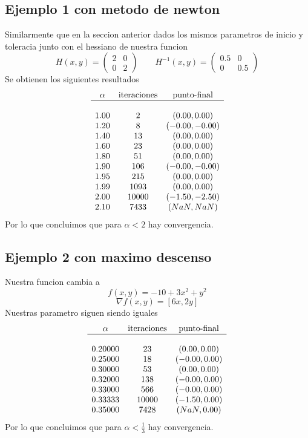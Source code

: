 \documentclass[letterpaper]{article}
\begin{document}
\subsection*{Ejemplo 1 con metodo de newton}
\noindent Similarmente que en la seccion anterior dados los mismos
parametros de inicio y toleracia junto con el hessiano de nuestra funcion
\[ H(x,y) =
  \begin{pmatrix}
    2 & 0 \\
    0 & 2
  \end{pmatrix}
  \qquad
  H^{-1}(x,y) =
  \begin{pmatrix}
    0.5 & 0 \\
    0 & 0.5
  \end{pmatrix}
\]
Se obtienen los siguientes resultados
\[
\begin{array}{c c c}
  \alpha & \text{iteraciones} & \text{punto-final} \\
  \hline \\
  1.00 & 2     & (0.00, 0.00)   \\
  1.20 & 8     & (-0.00, -0.00) \\
  1.40 & 13    & (0.00, 0.00)   \\
  1.60 & 23    & (0.00, 0.00)   \\
  1.80 & 51    & (0.00, 0.00)   \\
  1.90 & 106   & (-0.00, -0.00) \\
  1.95 & 215   & (0.00, 0.00)   \\
  1.99 & 1093  & (0.00, 0.00)   \\
  2.00 & 10000 & (-1.50, -2.50) \\
  2.10 & 7433  & (NaN, NaN)     \\
\end{array}
\]
Por lo que concluimos que para \(\alpha < 2\) hay convergencia.

\subsection*{Ejemplo 2 con maximo descenso}
\noindent Nuestra funcion cambia a
\[ f(x,y) = -10 + 3 x^2 + y^2 \]
\[ \nabla f (x,y) = [6 x , 2 y ] \]
Nuestras parametro siguen siendo iguales
\[
\begin{array}{c c c}
  \alpha & \text{iteraciones} & \text{punto-final} \\
  \hline \\
  0.20000 & 23    & (0.00, 0.00)  \\
  0.25000 & 18    & (-0.00, 0.00) \\
  0.30000 & 53    & (0.00, 0.00)  \\
  0.32000 & 138   & (-0.00, 0.00) \\
  0.33000 & 566   & (-0.00, 0.00) \\
  0.33333 & 10000 & (-1.50, 0.00) \\
  0.35000 & 7428  & (NaN, 0.00)   \\
\end{array}
\]
Por lo que concluimos que para \(\alpha < \frac 1 3 \) hay convergencia.
\end{document}
